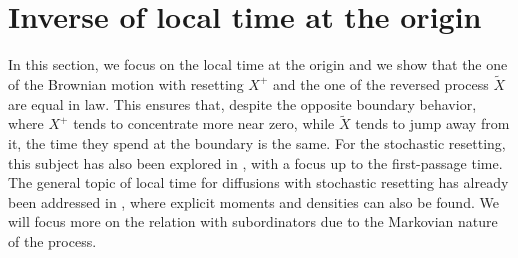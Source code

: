 \documentclass[11pt,a4paper]{article}
\theoremstyle{definition}
\theoremstyle{remark}
\begin{document}
\section{Inverse of local time at the origin}
\label{sec:local}
In this section, we focus on the local time at the origin and we show that the one of the Brownian motion with resetting \(X^+\) and the one of the reversed process $\widetilde{X}$ are equal in law. This ensures that, despite the opposite boundary behavior, where \(X^+\) tends to concentrate more near zero, while \(\widetilde{X}\) tends to jump away from it, the time they spend at the boundary is the same.
For the stochastic resetting, this subject has also been explored in \cite[Section 3]{singh2022}, with a focus up to the first-passage time. The general topic of local time for diffusions with stochastic resetting has already been addressed in \cite{localtime}, where explicit moments and densities can also be found. We will focus more on the relation with subordinators due to the Markovian nature of the process.
\end{document}
